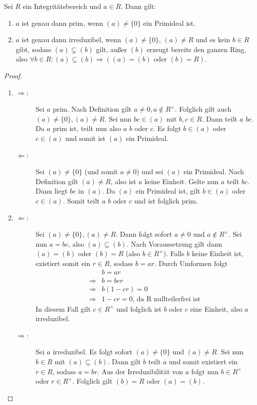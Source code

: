 \documentclass[12pt,a4paper]{scrartcl}
\begin{document}
\begin{lem} \label{lem:primired}
	Sei $R$ ein Integritätsbereich und $a\in R$. Dann gilt:
	\begin{enumerate}
		\item $a$ ist genau dann prim, wenn $(a) \neq \{0\}$ ein Primideal ist.
		\item $a$ ist genau dann irreduzibel, wenn $(a)\neq\{0\}$, $(a)\neq R$ und es kein $b \in R$ gibt, sodass $(a) \subsetneq (b)$ gilt, außer $(b)$ erzeugt bereits den ganzen Ring, also $\forall b\in R: (a) \subseteq (b)\Rightarrow ((a) = (b) \text{ oder } (b) = R)$.
	\end{enumerate}
\end{lem}
\begin{proof}
	\leavevmode
	\begin{enumerate}
	\item 
	\begin{description}
		\item[\glqq$\Rightarrow$\grqq:] Sei $a$ prim. Nach Definition gilt $a\neq 0, a\notin R^{\times}$. Folglich gilt auch $(a)\neq \{0\}, (a) \neq R$. Sei nun $bc\in (a)$ mit $b,c\in R$. Dann teilt $a$ $bc$. Da $a$ prim ist, teilt nun also $a$ $b$ oder $c$. Es folgt $b\in (a)$ oder $c\in (a)$ und somit ist $(a)$ ein Primideal.
		\item[\glqq$\Leftarrow$\grqq:] Sei $(a) \neq \{0\}$ (und somit $a\neq 0$) und sei $(a)$ ein Primideal. Nach Definition gilt $(a) \neq R$, also ist $a$ keine Einheit. Gelte nun $a$ teilt $bc$. Dann liegt $ bc$  in $(a)$. Da $(a)$ ein Primideal ist, gilt $b\in (a)$ oder $c\in (a)$. Somit teilt $a$ $b$ oder $c$ und ist folglich prim.
	\end{description}
	\item
	\begin{description}
		\item[\glqq$\Leftarrow$\grqq:] Sei $(a) \neq\{0\}, (a) \neq R$. Dann folgt sofort $a\neq 0$ und $a\notin R^{\times}$. Sei nun $a = bc$, also $(a)\subseteq (b)$. Nach Voraussetzung gilt dann $(a) = (b)$ oder $(b) = R$ (also $b\in R^{\times}$). Falls $b$ keine Einheit ist, existiert somit ein $r\in R$, sodass $b = ar$. Durch Umformen folgt
		\begin{align*}
			&b = ar \\
			\Rightarrow& b = bcr \\
			\Rightarrow& b(1-cr) = 0 \\
			\Rightarrow& 1-cr = 0 \text{, da R nullteilerfrei ist}
		\end{align*}
		In diesem Fall gilt $c \in R^{\times}$ und folglich ist $b$ oder $c$ eine Einheit, also $a$ irreduzibel.

		\item[\glqq$\Rightarrow$\grqq:] Sei $a$ irreduzibel. Es folgt sofort $(a) \neq \{0\}$ und $(a)\neq R$. Sei nun $b\in R$ mit $(a) \subseteq (b)$. Dann gilt $b$ teilt $a$ und somit existiert ein $r\in R$, sodass $a = br$. Aus der Irreduzibilität von $a$ folgt nun $b\in R^{\times}$ oder $r\in R^{\times}$. Folglich gilt $(b) = R$ oder $(a) = (b)$.
  \qedhere
	\end{description}
\end{enumerate}
\end{proof}
\end{document}
